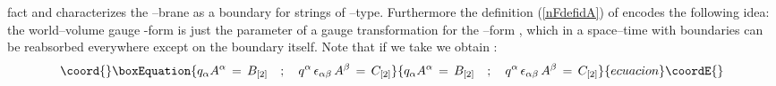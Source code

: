 \documentclass[a4paper,11pt]{article}
\begin{document}
fact and characterizes the \coordHE{}--brane as a boundary for
strings of \coordHE{}--type. Furthermore the definition (\ref{nFdefidA}) of \coordHE{}
encodes the following idea: the world--volume gauge \coordHE{}-form \coordHE{}
is just the parameter of a gauge transformation for the \coordHE{}--form \coordHE{}, which in a space--time with boundaries can be reabsorbed
everywhere except on the boundary itself. Note that if we
take \coordHE{} we obtain :
\begin{equation}\coord{}\boxEquation{
q_{\alpha} A^{\alpha} \, = \, B_{[2]} \quad ; \quad
   q^{\alpha} \, \epsilon_{\alpha \beta} \, A^{\beta} \, = \, C_{[2]}
\label{no q}
}{
q_{\alpha} A^{\alpha} \, = \, B_{[2]} \quad ; \quad
   q^{\alpha} \, \epsilon_{\alpha \beta} \, A^{\beta} \, = \, C_{[2]}
}{ecuacion}\coordE{}\end{equation}
\end{document}
